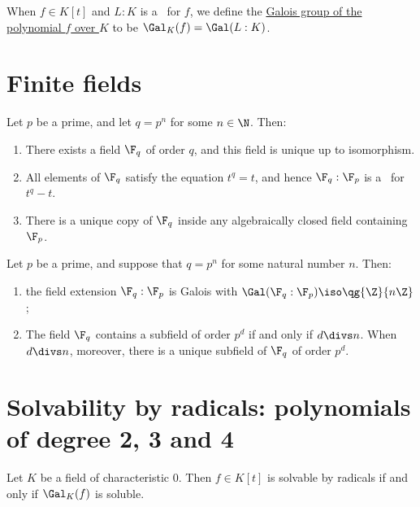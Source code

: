 \documentclass{article}
\begin{document}
  \begin{tdefinition}
    When \( f\in K[t] \) and \( L:K \) is a \sfe~for \( f \), we define the \ul{Galois group of the polynomial \( f \) over \( K \)} to be \( \Gal_K(f) = \Gal(L:K) \).
  \end{tdefinition}

\section{Finite fields}
  \begin{ttheorem}
    Let \( p \) be a prime, and let \( q=p^n \) for some \( n\in \N \). Then:
    \begin{enumerate}[label=(\alph*)]
      \item There exists a field \( \F_q \) of order \( q \), and this field is unique up to isomorphism.
      \item All elements of \( \F_q \) satisfy the equation \( t^q=t \), and hence \( \F_q:\F_p \) is a \sfe~for \( t^q-t \).
      \item There is a unique copy of \( \F_q \) inside any algebraically closed field containing \( \F_p \).
    \end{enumerate}
  \end{ttheorem}

  \begin{ttheorem}
    Let \( p \) be a prime, and suppose that \( q=p^n \) for some natural number \( n \). Then:
    \begin{enumerate}[label=(\alph*)]
      \item the field extension \( \F_q:\F_p \) is Galois with \( \Gal(\F_q:\F_p)\iso \qg{\Z}{n\Z} \);
      \item The field \( \F_q \) contains a subfield of order \( p^d \) if and only if \( d\divs n \). When \( d\divs n \), moreover, there is a unique subfield of \( \F_q \) of order \( p^d \).
    \end{enumerate}
  \end{ttheorem}

\section{Solvability by radicals: polynomials of degree 2, 3 and 4}
  \begin{ttheorem}
    Let \( K \) be a field of characteristic 0. Then \( f\in K[t] \) is solvable by radicals if and only if \( \Gal_K(f) \) is soluble.
  \end{ttheorem}
\end{document}
